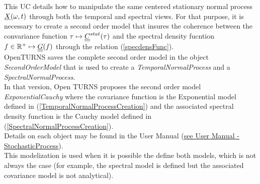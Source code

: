 \renewcommand{\filename}{docUC_StocProc_SecondOrderNormalProcess_Creation.tex}
\renewcommand{\filetitle}{UC : Creation of stationary normal process from temporal and spectral views}

\HeaderIIILevel

\label{SecondOrderNormalProcessCreation}

This UC details how to  manipulate the same centered stationary normal process ${\underline{X}}(\omega,t)$  through both the temporal and spectral views. For that purpose, it is necessary to create a second order model that insures the coherence between the convariance function $\tau \mapsto {\underline{\underline{C}}}^{stat}(\tau)$ and the spectral density fucntion  $f \in \mathbb{R}^+ \mapsto {\underline{\underline{G}}}(f)$ through the relation (\ref{specdensFunc}).\\

OpenTURNS saves the complete second order model in the object {\itshape SecondOrderModel} that is used to create a {\itshape TemporalNormalProcess} and a {\itshape SpectralNormalProcess}.\\

In that version, Open TURNS proposes the second order model {\itshape ExponentialCauchy} where the covariance function is the Exponential model defined in (\ref{TemporalNormalProcessCreation}) and the associated spectral density function is the Cauchy model defined in (\ref{SpectralNormalProcessCreation}).\\

Details on each object may be found in the User Manual  (\href{OpenTURNS_UserManual_TUI.pdf}{see User Manual - StochasticProcess}).\\

This modelization is used when it is possible the define both models, which is not always the case (for example, the spectral model is defined but the associated covariance model is not analytical).\\

